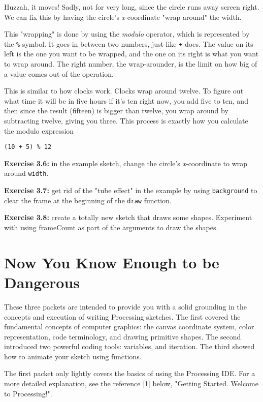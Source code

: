 \documentclass[
]{leaflet}
\begin{document}
Huzzah, it moves!
Sadly, not for very long, since the circle runs away screen right.
We can fix this by having the circle's \textit{x}-coordinate "wrap around" the width.

This "wrapping" is done by using the \textit{modulo} operator, which is represented by the \texttt{\%} symbol.
It goes in between two numbers, just like \texttt{+} does.
The value on its left is the one you want to be wrapped, and the one on its right is what you want to wrap around.
The right number, the wrap-arounder, is the limit on how big of a value comes out of the operation.

This is similar to how clocks work.
Clocks wrap around twelve.
To figure out what time it will be in five hours if it's ten right now, you add five to ten, and then since the result (fifteen) is bigger than twelve, you wrap around by subtracting twelve, giving you three.
This process is exactly how you calculate the modulo expression
\begin{lstlisting}
(10 + 5) % 12
\end{lstlisting}
\vspace{-0.5em}

\textbf{Exercise 3.6:} in the example sketch, change the circle's \textit{x}-coordinate to wrap around \texttt{width}.

\textbf{Exercise 3.7:} get rid of the "tube effect" in the example by using \texttt{background} to clear the frame at the beginning of the \texttt{draw} function.

\textbf{Exercise 3.8:} create a totally new sketch that draws some shapes.
Experiment with using frameCount as part of the arguments to draw the shapes.

\section{Now You Know Enough to be Dangerous}

These three packets are intended to provide you with a solid grounding in the concepts and execution of writing Processing sketches.
The first covered the fundamental concepts of computer graphics: the canvas coordinate system, color representation, code terminology, and drawing primitive shapes.
The second introduced two powerful coding tools: variables, and iteration.
The third showed how to animate your sketch using functions.

The first packet only lightly covers the basics of using the Processing IDE.
For a more detailed explanation, see the reference [1] below, "Getting Started. Welcome to Processing!".
\end{document}

